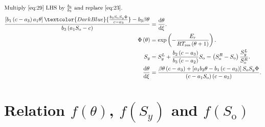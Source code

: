 \documentclass[
    8pt,
    aspectratio=1610,
    c,
    intlimits,
    leqno,
    professionalfonts,
]{beamer}
\begin{document}
\begin{frame}
	\frametitle{\secname}

	\begin{align}
		\shortintertext{Multiply~\eqref{eq:29} LHS by
			$\frac{b_{3}}{b_{3}}$ and replace~\eqref{eq:23}.}
		\frac{
		\left[
			b_{1}
			\left(c-a_{3}\right)
			a_{1}\theta
			\right]
		\textcolor{DarkBlue}{
		\frac{
		b_{3}
		S_{\text{o}}
		S_{y}
		\Phi
		}{c-a_{3}}
		}
		-b_{3}\beta\theta
		}{
		b_{3}
		\left(
		a_{1}S_{\text{o}}-c
		\right)
		}                       & =
		\diff{\theta}{\xi}.\notag   \\
		\setcounter{equation}{33}
		\Phi\left(\theta\right) & =
		\exp
		\left(
		-\frac{E_{r}}{
			RT_{\text{res}}\left(\theta+1\right)
		}
		\right).                    \\
		S_{y}                   & =
		S^{L}_{y}+
		\frac{b_{2}\left(c-a_{3}\right)}{b_{3}\left(c-a_{2}\right)}
		S_{\text{o}}=
		\left(
		S^{R}_{\text{o}}-
		S_{\text{o}}
		\right)
		\frac{S^{L}_{y}}{S^{R}_{\text{o}}}.
		\label{eq:35}               \\
		\diff{\theta}{\xi}
		                        & =
		\frac{
			\beta\theta
			\left(c-a_{3}\right)+
			\left[
				a_{1}
				b_{3}
				\theta-
				b_{1}
				\left(c-a_{3}\right)
				\right]
			S_{\text{o}}
			S_{y}
			\Phi}{
			\left(c-a_{1}S_{\text{o}}\right)
			\left(c-a_{3}\right)
		}.\label{eq:36}
	\end{align}
\end{frame}

\section{Relation $f\left(\theta\right)$, $f\left(S_{y}\right)$ and
  $f\left(S_{\text{o}}\right)$}
\end{document}
